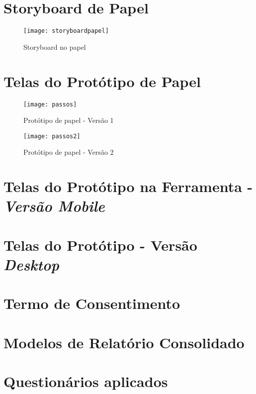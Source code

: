 \begin{apendicesenv}

\partapendices
\chapter{Storyboard de Papel}

\begin{figure}[!htb]
 \centering
 \texttt{[image: storyboardpapel]}
 \caption{Storyboard no papel}
 \label{Rotulo}

\end{figure}

\chapter{Telas do Protótipo de Papel}

\begin{figure}[!htb]
 \centering
 \texttt{[image: passos]}
 \caption{Protótipo de papel - Versão 1}
 \label{Rotulo}

\end{figure}

\begin{figure}[!htb]
 \centering
 \texttt{[image: passos2]}
 \caption{Protótipo de papel - Versão 2}
 \label{Rotulo}

\end{figure}

\chapter{Telas do Protótipo na Ferramenta - \textit{Versão Mobile}}
  

\chapter{Telas do Protótipo - Versão \textit{Desktop}}
  
  
\chapter{Termo de Consentimento}

  

\chapter{Modelos de Relatório Consolidado}

  
  


\chapter{Questionários aplicados}
  \label{questionários}
  
  

  
  \end{apendicesenv}
